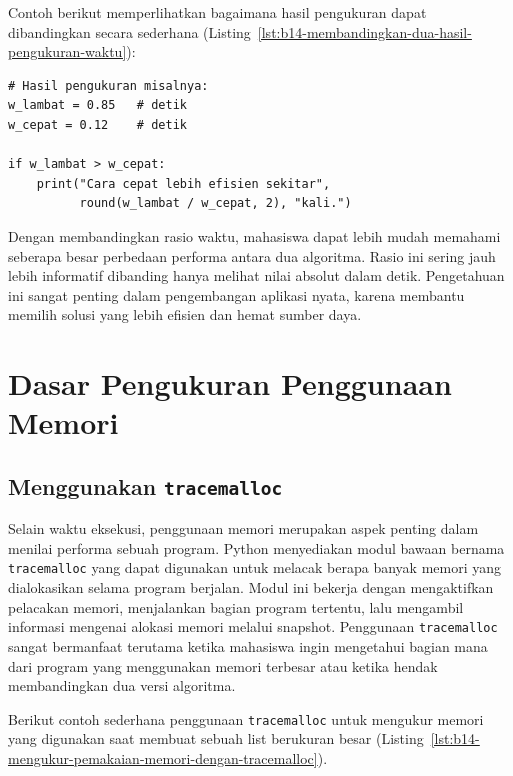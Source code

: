 Contoh berikut memperlihatkan bagaimana hasil pengukuran dapat dibandingkan secara sederhana (Listing~\ref{lst:b14-membandingkan-dua-hasil-pengukuran-waktu}):

\begin{lstlisting}[style=PythonStyle, caption={Membandingkan dua hasil pengukuran waktu}, label={lst:b14-membandingkan-dua-hasil-pengukuran-waktu}]
# Hasil pengukuran misalnya:
w_lambat = 0.85   # detik
w_cepat = 0.12    # detik

if w_lambat > w_cepat:
    print("Cara cepat lebih efisien sekitar",
          round(w_lambat / w_cepat, 2), "kali.")
\end{lstlisting}

Dengan membandingkan rasio waktu, mahasiswa dapat lebih mudah memahami seberapa besar perbedaan performa antara dua algoritma. Rasio ini sering jauh lebih informatif dibanding hanya melihat nilai absolut dalam detik. Pengetahuan ini sangat penting dalam pengembangan aplikasi nyata, karena membantu memilih solusi yang lebih efisien dan hemat sumber daya.

\section{Dasar Pengukuran Penggunaan Memori}

\subsection{Menggunakan \texttt{tracemalloc}}

Selain waktu eksekusi, penggunaan memori merupakan aspek penting dalam menilai performa sebuah program. Python menyediakan modul bawaan bernama \texttt{tracemalloc} yang dapat digunakan untuk melacak berapa banyak memori yang dialokasikan selama program berjalan. Modul ini bekerja dengan mengaktifkan pelacakan memori, menjalankan bagian program tertentu, lalu mengambil informasi mengenai alokasi memori melalui snapshot. Penggunaan \texttt{tracemalloc} sangat bermanfaat terutama ketika mahasiswa ingin mengetahui bagian mana dari program yang menggunakan memori terbesar atau ketika hendak membandingkan dua versi algoritma.

Berikut contoh sederhana penggunaan \texttt{tracemalloc} untuk mengukur memori yang digunakan saat membuat sebuah list berukuran besar (Listing~\ref{lst:b14-mengukur-pemakaian-memori-dengan-tracemalloc}).

